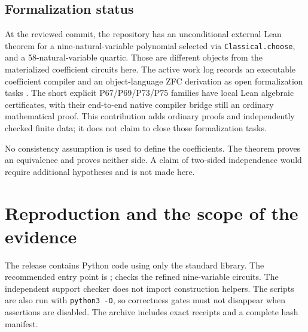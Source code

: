 \documentclass[11pt]{article}
\newcommand{\file}[1]{\texttt{\small\detokenize{#1}}}
\theoremstyle{definition}\newtheorem{definition}[theorem]{Definition}
\theoremstyle{remark}\newtheorem{remark}[theorem]{Remark}
\begin{document}
\subsection{Formalization status}
At the reviewed commit, the repository has an unconditional external Lean
theorem for a nine-natural-variable polynomial selected via
\texttt{Classical.choose}, and a 58-natural-variable quartic. Those are
different objects from the materialized coefficient circuits here.
The active work log records an executable coefficient compiler and an
object-language ZFC derivation as open formalization tasks \cite{status}.
The short explicit P67/P69/P73/P75 families have local Lean algebraic
certificates, with their end-to-end native compiler bridge still an ordinary
mathematical proof. This contribution adds ordinary proofs and independently
checked finite data; it does not claim to close those formalization tasks.

No consistency assumption is used to define the coefficients. The theorem
proves an equivalence and proves neither side. A claim of two-sided
independence would require additional hypotheses and is not made here.

\section{Reproduction and the scope of the evidence}
\label{sec:verification}
The release contains Python code using only the standard library. The
recommended entry point is \file{verify.py}; \file{verify_refined.py}
checks the refined nine-variable circuits. The independent support checker
does not import construction helpers. The scripts are also run with
\texttt{python3 -O}, so correctness gates must not disappear when assertions
are disabled. The archive includes exact receipts and a complete hash manifest.
\end{document}
